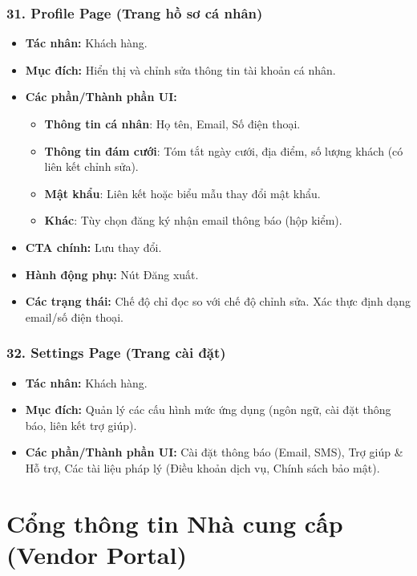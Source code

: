 \documentclass[11pt,a4paper]{article}
\begin{document}
\subsubsection{31. Profile Page (Trang hồ sơ cá nhân)}
\begin{itemize}
    \item \textbf{Tác nhân:} Khách hàng.
    \item \textbf{Mục đích:} Hiển thị và chỉnh sửa thông tin tài khoản cá nhân.
    \item \textbf{Các phần/Thành phần UI:}
    \begin{itemize}
        \item \textbf{Thông tin cá nhân}: Họ tên, Email, Số điện thoại.
        \item \textbf{Thông tin đám cưới}: Tóm tắt ngày cưới, địa điểm, số lượng khách (có liên kết chỉnh sửa).
        \item \textbf{Mật khẩu}: Liên kết hoặc biểu mẫu thay đổi mật khẩu.
        \item \textbf{Khác}: Tùy chọn đăng ký nhận email thông báo (hộp kiểm).
    \end{itemize}
    \item \textbf{CTA chính:} Lưu thay đổi.
    \item \textbf{Hành động phụ:} Nút Đăng xuất.
    \item \textbf{Các trạng thái:} Chế độ chỉ đọc so với chế độ chỉnh sửa. Xác thực định dạng email/số điện thoại.
\end{itemize}

\subsubsection{32. Settings Page (Trang cài đặt)}
\begin{itemize}
    \item \textbf{Tác nhân:} Khách hàng.
    \item \textbf{Mục đích:} Quản lý các cấu hình mức ứng dụng (ngôn ngữ, cài đặt thông báo, liên kết trợ giúp).
    \item \textbf{Các phần/Thành phần UI:} Cài đặt thông báo (Email, SMS), Trợ giúp \& Hỗ trợ, Các tài liệu pháp lý (Điều khoản dịch vụ, Chính sách bảo mật).
\end{itemize}

\section{Cổng thông tin Nhà cung cấp (Vendor Portal)}
\end{document}
